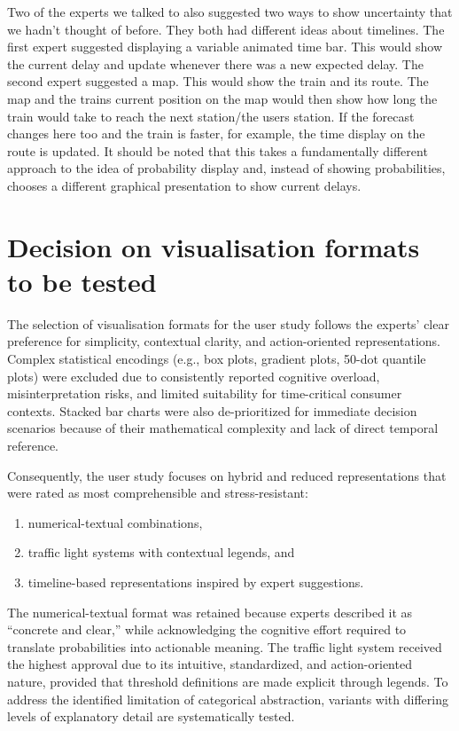 \documentclass[final,journal,a4paper]{IEEEtran}
\begin{document}
Two of the experts we talked to also suggested two ways to show uncertainty that we hadn't thought of before. They both had different ideas about timelines. The first expert suggested displaying a variable animated time bar. This would show the current delay and update whenever there was a new expected delay. The second expert suggested a map. This would show the train and its route. The map and the trains current position on the map would then show how long the train would take to reach the next station/the users station. If the forecast changes here too and the train is faster, for example, the time display on the route is updated. It should be noted that this takes a fundamentally different approach to the idea of probability display and, instead of showing probabilities, chooses a different graphical presentation to show current delays.

\section{Decision on visualisation formats to be tested}
The selection of visualisation formats for the user study follows the experts’ clear preference for simplicity, contextual clarity, and action-oriented representations. Complex statistical encodings (e.g., box plots, gradient plots, 50-dot quantile plots) were excluded due to consistently reported cognitive overload, misinterpretation risks, and limited suitability for time-critical consumer contexts. Stacked bar charts were also de-prioritized for immediate decision scenarios because of their mathematical complexity and lack of direct temporal reference.

Consequently, the user study focuses on hybrid and reduced representations that were rated as most comprehensible and stress-resistant:
\begin{enumerate}
    \item numerical-textual combinations,
    \item traffic light systems with contextual legends, and
    \item timeline-based representations inspired by expert suggestions.
\end{enumerate}

The numerical-textual format was retained because experts described it as “concrete and clear,” while acknowledging the cognitive effort required to translate probabilities into actionable meaning. The traffic light system received the highest approval due to its intuitive, standardized, and action-oriented nature, provided that threshold definitions are made explicit through legends. To address the identified limitation of categorical abstraction, variants with differing levels of explanatory detail are systematically tested.
\end{document}
